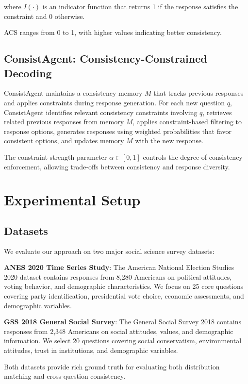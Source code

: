 \documentclass[sigconf, anonymous]{acmart}
\begin{document}
where $I(\cdot)$ is an indicator function that returns 1 if the response satisfies the constraint and 0 otherwise.

ACS ranges from 0 to 1, with higher values indicating better consistency.

\subsection{ConsistAgent: Consistency-Constrained Decoding}

ConsistAgent maintains a consistency memory $M$ that tracks previous responses and applies constraints during response generation. For each new question $q$, ConsistAgent identifies relevant consistency constraints involving $q$, retrieves related previous responses from memory $M$, applies constraint-based filtering to response options, generates responses using weighted probabilities that favor consistent options, and updates memory $M$ with the new response.

The constraint strength parameter $\alpha \in [0,1]$ controls the degree of consistency enforcement, allowing trade-offs between consistency and response diversity.

\section{Experimental Setup}

\subsection{Datasets}

We evaluate our approach on two major social science survey datasets:

\textbf{ANES 2020 Time Series Study}: The American National Election Studies 2020 dataset contains responses from 8,280 Americans on political attitudes, voting behavior, and demographic characteristics. We focus on 25 core questions covering party identification, presidential vote choice, economic assessments, and demographic variables.

\textbf{GSS 2018 General Social Survey}: The General Social Survey 2018 contains responses from 2,348 Americans on social attitudes, values, and demographic information. We select 20 questions covering social conservatism, environmental attitudes, trust in institutions, and demographic variables.

Both datasets provide rich ground truth for evaluating both distribution matching and cross-question consistency.
\end{document}

